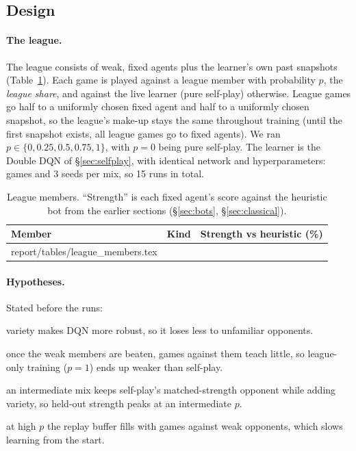 \documentclass[11pt]{article}
\makeatletter
\newcommand{\tabinput}[1]{\@@input #1 }
\makeatother
\begin{document}
\subsection{Design}

\paragraph{The league.} The league consists of weak, fixed agents plus the
learner's own past snapshots (Table~\ref{tab:league_members}). Each game is
played against a league member with probability $p$, the \emph{league share},
and against the live learner (pure self-play) otherwise. League games go half to
a uniformly chosen fixed agent and half to a uniformly chosen snapshot, so the
league's make-up stays the same throughout training (until the first snapshot
exists, all league games go to fixed agents). We ran $p \in \{0, 0.25, 0.5,
0.75, 1\}$, with $p=0$ being pure self-play. The learner is the Double DQN of
\S\ref{sec:selfplay}, with identical network and hyperparameters: \TrainGames{}
games and 3 seeds per mix, so 15 runs in total.

\begin{table}[H]
\centering
\caption{League members. ``Strength'' is each fixed agent's score against the
heuristic bot from the earlier sections (\S\ref{sec:bots}, \S\ref{sec:classical}).}
\label{tab:league_members}
\small
\begin{tabular}{@{}lll@{}}
\toprule
Member & Kind & Strength vs heuristic (\%) \\
\midrule
\tabinput{report/tables/league_members.tex}
\bottomrule
\end{tabular}
\end{table}

\paragraph{Hypotheses.} Stated before the runs:
\begin{description}[leftmargin=1.2em,style=nextline,itemsep=2pt]
  \item[H1 (robustness):] variety makes DQN more robust, so it loses less to
        unfamiliar opponents.
  \item[H2 (weak signal):] once the weak members are beaten, games against them
        teach little, so league-only training ($p=1$) ends up weaker than
        self-play.
  \item[H3 (best mix):] an intermediate mix keeps self-play's matched-strength
        opponent while adding variety, so held-out strength peaks at an
        intermediate $p$.
  \item[H4 (replay dilution):] at high $p$ the replay buffer fills with games
        against weak opponents, which slows learning from the start.
\end{description}
\end{document}
